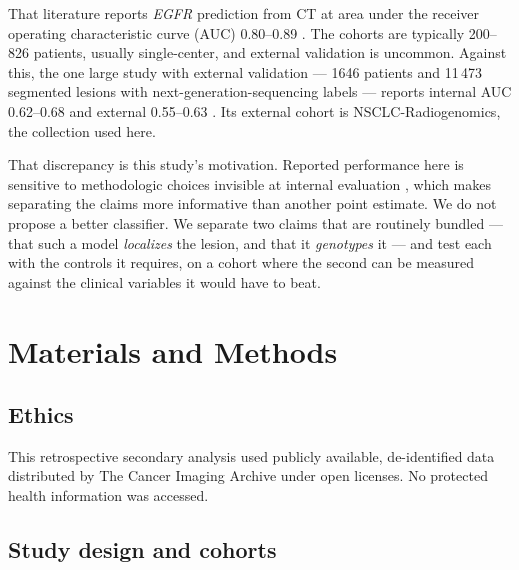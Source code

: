 \documentclass[11pt]{article}
\begin{document}
That literature reports \textit{EGFR} prediction from CT at area under the
receiver operating characteristic curve (AUC) 0.80--0.89
\citep{huang2025,shang2023,lai2026,wu2024,le2026}. The cohorts are typically
200--826 patients, usually single-center, and external validation is uncommon.
Against this, the one large study with external validation --- 1646 patients and
11\,473 segmented lesions with next-generation-sequencing labels --- reports
internal AUC 0.62--0.68 and external 0.55--0.63 \citep{rodriguez2026}. Its
external cohort is NSCLC-Radiogenomics, the collection used here.

That discrepancy is this study's motivation. Reported performance here is
sensitive to methodologic choices invisible at internal evaluation
\citep{maleki2022,horvat2024}, which makes separating the claims more informative
than another point estimate. We do not propose a better classifier. We separate
two claims that are routinely bundled --- that such a model \textit{localizes} the
lesion, and that it \textit{genotypes} it --- and test each with the controls it
requires, on a cohort where the second can be measured against the clinical
variables it would have to beat.

\section*{Materials and Methods}

\subsection*{Ethics}

This retrospective secondary analysis used publicly available, de-identified data
distributed by The Cancer Imaging Archive under open licenses. No protected health
information was accessed.


\subsection*{Study design and cohorts}
\end{document}
